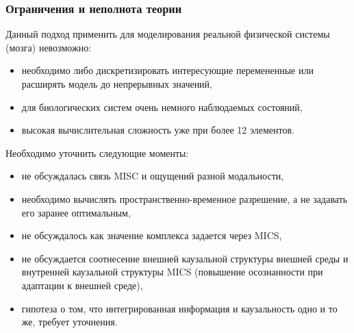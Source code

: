 \documentclass[default]{beamer}
\begin{document}
	\begin{frame}
		\frametitle{Ограничения и неполнота теории}
		
		Данный подход применить для моделирования реальной физической системы (мозга) невозможно:
		\begin{itemize}
			\item необходимо либо дискретизировать интересующие перемененные или расширять модель до непрерывных значений,
			\item для биологических систем очень немного наблюдаемых состояний,
			\item высокая вычислительная сложность уже при более 12 элементов.
		\end{itemize}

		Необходимо уточнить следующие моменты:		
		\begin{itemize}
			\item не обсуждалась связь MISC и ощущений разной модальности,
			\item необходимо вычислять пространственно-временное разрешение, а не задавать его заранее оптимальным,
			\item не обсуждалось как значение комплекса задается через MICS,
			\item не обсуждается соотнесение внешней каузальной структуры внешней среды и внутренней каузальной структуры MICS (повышение осознанности при адаптации к внешней среде),
			\item гипотеза о том, что интегрированная информация и каузальность одно и то же, требует уточнения.
		\end{itemize}
	\end{frame}
														
%		
%				
	
\end{document}
